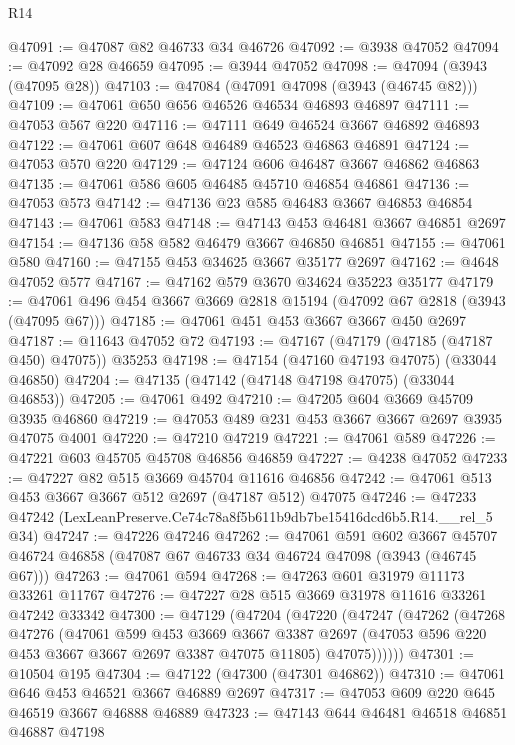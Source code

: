 \begin{lexlean}{R14}
\begin{coremodule}
@47091 := @47087 @82 @46733 @34 @46726
@47092 := @3938 @47052
@47094 := @47092 @28 @46659
@47095 := @3944 @47052
@47098 := @47094 (@3943 (@47095 @28))
@47103 := @47084 (@47091 @47098 (@3943 (@46745 @82)))
@47109 := @47061 @650 @656 @46526 @46534 @46893 @46897
@47111 := @47053 @567 @220
@47116 := @47111 @649 @46524 @3667 @46892 @46893
@47122 := @47061 @607 @648 @46489 @46523 @46863 @46891
@47124 := @47053 @570 @220
@47129 := @47124 @606 @46487 @3667 @46862 @46863
@47135 := @47061 @586 @605 @46485 @45710 @46854 @46861
@47136 := @47053 @573
@47142 := @47136 @23 @585 @46483 @3667 @46853 @46854
@47143 := @47061 @583
@47148 := @47143 @453 @46481 @3667 @46851 @2697
@47154 := @47136 @58 @582 @46479 @3667 @46850 @46851
@47155 := @47061 @580
@47160 := @47155 @453 @34625 @3667 @35177 @2697
@47162 := @4648 @47052 @577
@47167 := @47162 @579 @3670 @34624 @35223 @35177
@47179 := @47061 @496 @454 @3667 @3669 @2818 @15194 (@47092 @67 @2818 (@3943 (@47095 @67)))
@47185 := @47061 @451 @453 @3667 @3667 @450 @2697
@47187 := @11643 @47052 @72
@47193 := @47167 (@47179 (@47185 (@47187 @450) @47075)) @35253
@47198 := @47154 (@47160 @47193 @47075) (@33044 @46850)
@47204 := @47135 (@47142 (@47148 @47198 @47075) (@33044 @46853))
@47205 := @47061 @492
@47210 := @47205 @604 @3669 @45709 @3935 @46860
@47219 := @47053 @489 @231 @453 @3667 @3667 @2697 @3935 @47075 @4001
@47220 := @47210 @47219
@47221 := @47061 @589
@47226 := @47221 @603 @45705 @45708 @46856 @46859
@47227 := @4238 @47052
@47233 := @47227 @82 @515 @3669 @45704 @11616 @46856
@47242 := @47061 @513 @453 @3667 @3667 @512 @2697 (@47187 @512) @47075
@47246 := @47233 @47242 (LexLeanPreserve.Ce74c78a8f5b611b9db7be15416dcd6b5.R14.__rel_5 @34)
@47247 := @47226 @47246
@47262 := @47061
    @591
    @602
    @3667
    @45707
    @46724
    @46858
    (@47087 @67 @46733 @34 @46724 @47098 (@3943 (@46745 @67)))
@47263 := @47061 @594
@47268 := @47263 @601 @31979 @11173 @33261 @11767
@47276 := @47227 @28 @515 @3669 @31978 @11616 @33261 @47242 @33342
@47300 := @47129
    (@47204
      (@47220
        (@47247
          (@47262
            (@47268
              @47276
              (@47061
                @599
                @453
                @3669
                @3667
                @3387
                @2697
                (@47053 @596 @220 @453 @3667 @3667 @2697 @3387 @47075 @11805)
                @47075))))))
@47301 := @10504 @195
@47304 := @47122 (@47300 (@47301 @46862))
@47310 := @47061 @646 @453 @46521 @3667 @46889 @2697
@47317 := @47053 @609 @220 @645 @46519 @3667 @46888 @46889
@47323 := @47143 @644 @46481 @46518 @46851 @46887 @47198

\end{coremodule}
\end{lexlean}
